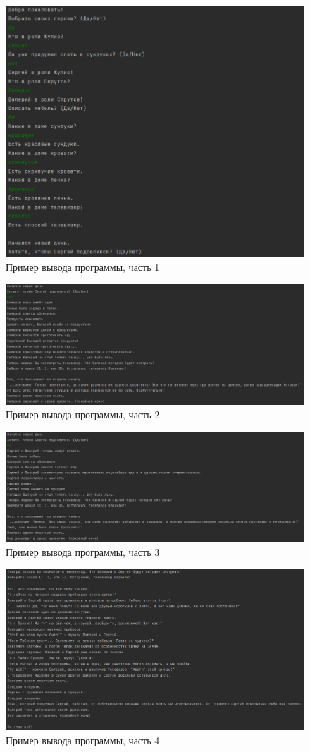 \documentclass[12pt]{article}
\begin{document}
\begin{figure}[h]
    \centering
    \includegraphics[width=0.52\linewidth]{image3.png}
    \caption{Пример вывода программы, часть 1}
\end{figure}
\newpage
\begin{figure}[h]
    \centering
    \includegraphics[width=\linewidth]{image4.png}
    \caption{Пример вывода программы, часть 2}
\end{figure}

\begin{figure}[h]
    \centering
    \includegraphics[width=\linewidth]{image5.png}
    \caption{Пример вывода программы, часть 3}
\end{figure}
\newpage
\begin{figure}[h]
    \centering
    \includegraphics[width=\linewidth]{image6.png}
    \caption{Пример вывода программы, часть 4}
\end{figure}
\end{document}
